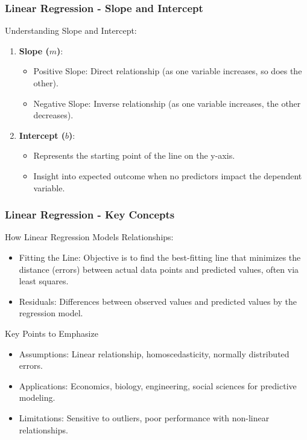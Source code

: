 \documentclass{beamer}
\begin{document}
\begin{frame}[fragile]
    \frametitle{Linear Regression - Slope and Intercept}
    Understanding Slope and Intercept:
    \begin{enumerate}
        \item \textbf{Slope ($m$)}:
        \begin{itemize}
            \item Positive Slope: Direct relationship (as one variable increases, so does the other).
            \item Negative Slope: Inverse relationship (as one variable increases, the other decreases).
        \end{itemize}
        
        \item \textbf{Intercept ($b$)}:
        \begin{itemize}
            \item Represents the starting point of the line on the y-axis.
            \item Insight into expected outcome when no predictors impact the dependent variable.
        \end{itemize}
    \end{enumerate}
\end{frame}

\begin{frame}[fragile]
    \frametitle{Linear Regression - Key Concepts}
    How Linear Regression Models Relationships:
    \begin{itemize}
        \item Fitting the Line: Objective is to find the best-fitting line that minimizes the distance (errors) between actual data points and predicted values, often via least squares.
        \item Residuals: Differences between observed values and predicted values by the regression model.
    \end{itemize}

    \begin{block}{Key Points to Emphasize}
    \begin{itemize}
        \item Assumptions: Linear relationship, homoscedasticity, normally distributed errors.
        \item Applications: Economics, biology, engineering, social sciences for predictive modeling.
        \item Limitations: Sensitive to outliers, poor performance with non-linear relationships.
    \end{itemize}
    \end{block}
\end{frame}
\end{document}
